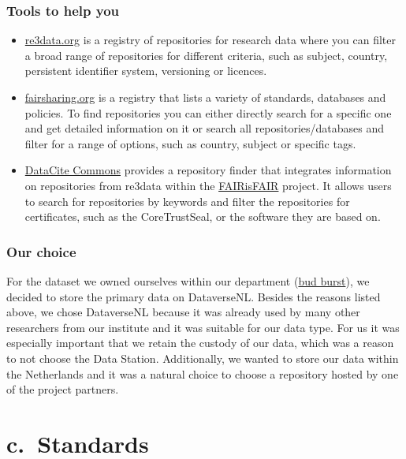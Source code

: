 \documentclass[
]{book}
\begin{document}
\hypertarget{tools-to-help-you}{%
\section{Tools to help you}\label{tools-to-help-you}}

\begin{itemize}
\item
  \href{http://re3data.org}{re3data.org} is a registry of repositories for research data where you can filter a broad range of repositories for different criteria, such as subject, country, persistent identifier system, versioning or licences.
\item
  \href{http://fairsharing.org}{fairsharing.org} is a registry that lists a variety of standards, databases and policies. To find repositories you can either directly search for a specific one and get detailed information on it or search all repositories/databases and filter for a range of options, such as country, subject or specific tags.
\item
  \href{https://commons.datacite.org/}{DataCite Commons} provides a repository finder that integrates information on repositories from re3data within the \href{https://www.fairsfair.eu/}{FAIRisFAIR} project. It allows users to search for repositories by keywords and filter the repositories for certificates, such as the CoreTrustSeal, or the software they are based on.
\end{itemize}

\hypertarget{our-choice}{%
\section{Our choice}\label{our-choice}}

For the dataset we owned ourselves within our department (\protect\hyperlink{budburst}{bud burst}), we decided to store the primary data on DataverseNL. Besides the reasons listed above, we chose DataverseNL because it was already used by many other researchers from our institute and it was suitable for our data type. For us it was especially important that we retain the custody of our data, which was a reason to not choose the Data Station. Additionally, we wanted to store our data within the Netherlands and it was a natural choice to choose a repository hosted by one of the project partners.

\hypertarget{part-c.-standards}{%
\part*{c.~Standards}\label{part-c.-standards}}
\end{document}

